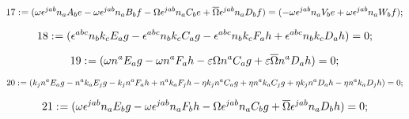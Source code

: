 \documentclass[11pt]{article}
\def\specialcolon{\mathrel{\mathop{:}}\hspace{-.5em}}
\renewcommand{\bar}[1]{\overline{#1}}
\begin{document}
\begin{dmath*}[compact, spread=2pt]
17\specialcolon{}= (\omega {\epsilon}^{j a b} {n}_{a} {A}_{b} e - \omega {\epsilon}^{j a b} {n}_{a} {B}_{b} f - \Omega {\epsilon}^{j a b} {n}_{a} {C}_{b} e + \bar \Omega {\epsilon}^{j a b} {n}_{a} {D}_{b} f) = ( - \omega {\epsilon}^{j a b} {n}_{a} {V}_{b} e + \omega {\epsilon}^{j a b} {n}_{a} {W}_{b} f);
\end{dmath*}

\begin{dmath*}[compact, spread=2pt]
18\specialcolon{}= ({\epsilon}^{a b c} {n}_{b} {k}_{c} {E}_{a} g - {\epsilon}^{a b c} {n}_{b} {k}_{c} {C}_{a} g - {\epsilon}^{a b c} {n}_{b} {k}_{c} {F}_{a} h + {\epsilon}^{a b c} {n}_{b} {k}_{c} {D}_{a} h) = 0;
\end{dmath*}

\begin{dmath*}[compact, spread=2pt]
19\specialcolon{}= (\omega {n}^{a} {E}_{a} g - \omega {n}^{a} {F}_{a} h - \varepsilon \Omega {n}^{a} {C}_{a} g + \varepsilon \bar \Omega {n}^{a} {D}_{a} h) = 0;
\end{dmath*}

\begin{dmath*}[compact, spread=2pt]
20\specialcolon{}= ({k}_{j} {n}^{a} {E}_{a} g - {n}^{a} {k}_{a} {E}_{j} g - {k}_{j} {n}^{a} {F}_{a} h + {n}^{a} {k}_{a} {F}_{j} h - \eta {k}_{j} {n}^{a} {C}_{a} g + \eta {n}^{a} {k}_{a} {C}_{j} g + \eta {k}_{j} {n}^{a} {D}_{a} h - \eta {n}^{a} {k}_{a} {D}_{j} h) = 0;
\end{dmath*}

\begin{dmath*}[compact, spread=2pt]
21\specialcolon{}= (\omega {\epsilon}^{j a b} {n}_{a} {E}_{b} g - \omega {\epsilon}^{j a b} {n}_{a} {F}_{b} h - \Omega {\epsilon}^{j a b} {n}_{a} {C}_{b} g + \bar \Omega {\epsilon}^{j a b} {n}_{a} {D}_{b} h) = 0;
\end{dmath*}
\end{document}
